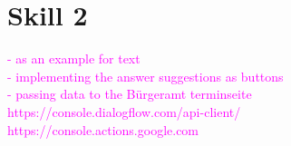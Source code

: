 \chapter{Skill 2}
\label{maintwo}

\textcolor{magenta}{
- as an example for text\\
- implementing the answer suggestions as buttons\\
- passing data to the Bürgeramt terminseite\\
https://console.dialogflow.com/api-client/ \\
https://console.actions.google.com
}
